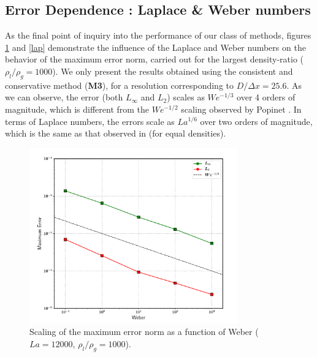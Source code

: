 \subsection*{Error Dependence : Laplace \& Weber numbers}

As the final point of inquiry into the performance of our class of methods, figures \ref{web} and \ref{lap} demonstrate the influence of the Laplace and Weber numbers on the behavior of the maximum error norm, carried out for the largest density-ratio ($\rho_l/\rho_g = 1000$). We only present the results obtained using the consistent and conservative method (\textbf{M3}), for a resolution corresponding to $D / \Delta x = 25.6$. As we can observe, the error (both $L_\infty$ and $L_2$) scales as $We^{-1/3}$ over 4 orders of magnitude, which is different from the $We^{-1/2}$ scaling observed by Popinet \cite{popinet2009accurate} . In terms of Laplace numbers, the errors scale as $La^{1/6}$ over two orders of magnitude, which is the same as that observed in \cite{popinet2009accurate} (for equal densities).

\begin{figure}
    \centering
    \includegraphics[width = 0.8\textwidth]{plots/droplet_advect/webers.pdf}
\caption{ Scaling of the maximum error norm as a function of Weber ($La = 12000$, $\rho_l / \rho_g = 1000$). }
    \label{web}
\end{figure}

